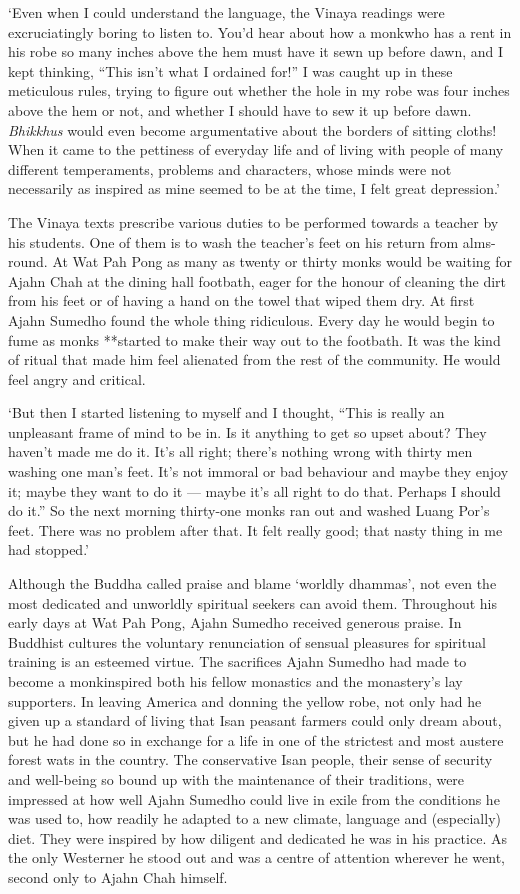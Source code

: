 `Even when I could understand the language, the Vinaya readings were
excruciatingly boring to listen to. You'd hear about how a monkwho has a
rent in his robe so many inches above the hem must have it sewn up
before dawn, and I kept thinking, ``This isn't what I ordained for!'' I
was caught up in these meticulous rules, trying to figure out whether
the hole in my robe was four inches above the hem or not, and whether I
should have to sew it up before dawn. \emph{Bhikkhus} would even become
argumentative about the borders of sitting cloths! When it came to the
pettiness of everyday life and of living with people of many different
temperaments, problems and characters, whose minds were not necessarily
as inspired as mine seemed to be at the time, I felt great depression.'

The Vinaya texts prescribe various duties to be performed towards a
teacher by his students. One of them is to wash the teacher's feet on
his return from alms-round. At Wat Pah Pong as many as twenty or thirty
monks would be waiting for Ajahn Chah at the dining hall footbath, eager
for the honour of cleaning the dirt from his feet or of having a hand on
the towel that wiped them dry. At first Ajahn Sumedho found the whole
thing ridiculous. Every day he would begin to fume as monks **started to
make their way out to the footbath. It was the kind of ritual that made
him feel alienated from the rest of the community. He would feel angry
and critical.

`But then I started listening to myself and I thought,
``This is really an unpleasant frame of mind to be in. Is it anything to
get so upset about? They haven't made me do it. It's all right; there's
nothing wrong with thirty men washing one man's feet. It's not immoral
or bad behaviour and maybe they enjoy it; maybe they want to do it ---
maybe it's all right to do that. Perhaps I should do it.'' So the next
morning thirty-one monks ran out and washed Luang Por's feet. There was
no problem after that. It felt really good; that nasty thing in me had
stopped.'

Although the Buddha called praise and blame `worldly dhammas', not even
the most dedicated and unworldly spiritual seekers can avoid them.
Throughout his early days at Wat Pah Pong, Ajahn Sumedho received
generous praise. In Buddhist cultures the voluntary renunciation of
sensual pleasures for spiritual training is an esteemed virtue. The
sacrifices Ajahn Sumedho had made to become a monkinspired both his
fellow monastics and the monastery's lay supporters. In leaving America
and donning the yellow robe, not only had he given up a standard of
living that Isan peasant farmers could only dream about, but he had done
so in exchange for a life in one of the strictest and most austere
forest wats in the country. The conservative Isan people, their sense of
security and well-being so bound up with the maintenance of their
traditions, were impressed at how well Ajahn Sumedho could live in exile
from the conditions he was used to, how readily he adapted to a new
climate, language and (especially) diet. They were inspired by how
diligent and dedicated he was in his practice. As the only Westerner he
stood out and was a centre of attention wherever he went, second only to
Ajahn Chah himself.

